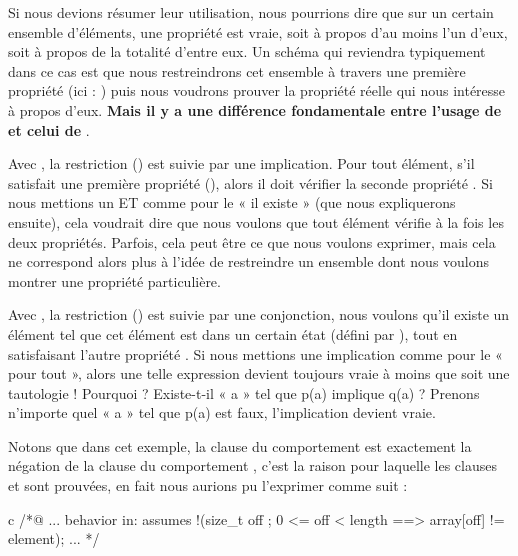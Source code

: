 Si nous devions résumer leur utilisation, nous pourrions dire que sur un certain
ensemble d'éléments, une propriété est vraie, soit à propos d'au moins l'un
d'eux, soit à propos de la totalité d'entre eux. Un schéma qui reviendra
typiquement dans ce cas est que nous restreindrons cet ensemble à travers une
première propriété (ici : ) puis nous voudrons prouver la
propriété réelle qui nous intéresse à propos d'eux. \textbf{Mais il y a une
différence fondamentale entre l'usage de  et celui de }.


Avec , la restriction
() est suivie par une implication. Pour tout élément, s'il
satisfait une première propriété (), alors il doit vérifier la
seconde propriété . Si nous mettions un ET comme pour le « il
existe » (que nous expliquerons ensuite), cela voudrait dire que nous voulons
que tout élément vérifie à la fois les deux propriétés. Parfois, cela peut être
ce que nous voulons exprimer, mais cela ne correspond alors plus à l'idée de
restreindre un ensemble dont nous voulons montrer une propriété particulière.


Avec , la restriction
() est suivie par une conjonction, nous voulons qu'il existe un
élément tel que cet élément est dans un certain état (défini par ),
tout en satisfaisant l'autre propriété . Si nous mettions une
implication comme pour le « pour tout », alors une telle expression devient
toujours vraie à moins que  soit une tautologie ! Pourquoi ?
Existe-t-il « a » tel que p(a) implique q(a) ? Prenons n'importe quel « a » tel
que p(a) est faux, l'implication devient vraie.


Notons que dans cet exemple, la clause  du comportement
 est exactement la négation de la clause 
du comportement , c'est la raison pour laquelle les clauses
 et  sont prouvées, en fait nous
aurions pu l'exprimer comme suit :


\begin{CodeBlock}{c}
  /*@ ...
    behavior in:
      assumes !(\forall size_t off ; 0 <= off < length ==> array[off] != element);
    ...
  */
\end{CodeBlock}


